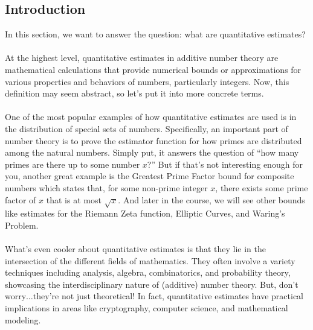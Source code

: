 \documentclass[8pt]{extarticle}
\begin{document}
\subsection{Introduction}
In this section, we want to answer the question: what are quantitative estimates? \\
\\
At the highest level, quantitative estimates in additive number theory are mathematical calculations that provide numerical bounds or approximations for various properties and behaviors of numbers, particularly integers. Now, this definition may seem abstract, so let's put it into more concrete terms.\\
\\
One of the most popular examples of how quantitative estimates are used is in the distribution of special sets of numbers. Specifically, an important part of number theory is to prove the estimator function for how primes are distributed among the natural numbers. Simply put, it answers the question of ``how many primes are there up to some number $x$?'' But if that's not interesting enough for you, another great example is the Greatest Prime Factor bound for composite numbers which states that, for some non-prime integer $x$, there exists some prime factor of $x$ that is at most $\sqrt{x}$. And later in the course, we will see other bounds like estimates for the Riemann Zeta function, Elliptic Curves, and Waring's Problem. \\
\\
What's even cooler about quantitative estimates is that they lie in the intersection of the different fields of mathematics. They often involve a variety techniques including analysis, algebra, combinatorics, and probability theory, showcasing the interdisciplinary nature of (additive) number theory. But, don't worry$\dots$they're not just theoretical! In fact, quantitative estimates have practical implications in areas like cryptography, computer science, and mathematical modeling.
\end{document}
